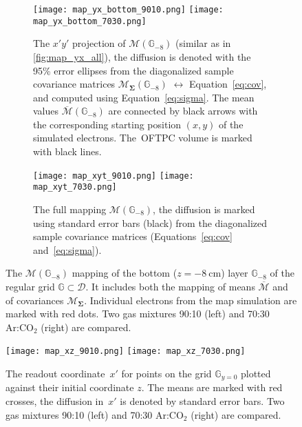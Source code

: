 		\begin{figure}
			\centering
			\begin{subfigure}[t]{\textwidth}
				\centering
				\texttt{[image: map\_yx\_bottom\_9010.png]}
				\hfill
				\texttt{[image: map\_yx\_bottom\_7030.png]}
				\caption{The $x'y'$ projection of $\mathcal{M}(\mathbb{G}_{-8})$ (similar as in \cref{fig:map_yx_all}), the diffusion is denoted with the 95\% error ellipses from  the diagonalized sample covariance matrices $\mathcal{M}_\mathbf{\Sigma}(\mathbb{G}_{-8})$ $\leftrightarrow$ Equation~\ref{eq:cov}, and computed using Equation~\ref{eq:sigma}. The mean values $\overline{\mathcal{M}}(\mathbb{G}_{-8})$ are connected by black arrows with the corresponding starting position $(x,y)$ of the simulated electrons. The~\ac{OFTPC} volume is marked with black lines.}
				\label{fig:map_yx_bot}
			\end{subfigure}
			
			\begin{subfigure}[t]{\textwidth}
				\centering
				\texttt{[image: map\_xyt\_9010.png]}
				\hfill
				\texttt{[image: map\_xyt\_7030.png]}
				\caption{The full mapping $\mathcal{M}(\mathbb{G}_{-8})$, the diffusion is marked using standard error bars (black) from the diagonalized sample covariance matrices (Equations~\ref{eq:cov} and~\ref{eq:sigma}).}
				\label{fig:map_xyt}
			\end{subfigure}
			\caption{The $\mathcal{M}(\mathbb{G}_{-8})$ mapping of the bottom ($z = \SI{-8}{\centi\meter}$) layer $\mathbb{G}_{-8}$ of the regular grid $\mathbb{G}\subset\mathcal{D}$. It includes both the mapping of means $\overline{\mathcal{M}}$ and of covariances $\mathcal{M}_\mathbf{\Sigma}$. Individual electrons from the map simulation are marked with red dots. Two gas mixtures 90:10 (left) and 70:30 Ar:CO$_2$ (right) are compared.}
			\label{fig:map_bot}
		\end{figure}
		
		\begin{figure}
			\centering
			\texttt{[image: map\_xz\_9010.png]}
			\hfill
			\texttt{[image: map\_xz\_7030.png]}
			\caption{The readout coordinate~$x'$ for points on the grid $\mathbb{G}_{y=0}$ plotted against their initial coordinate $z$. The means are marked with red crosses, the diffusion in~$x'$ is denoted by standard error bars. Two gas mixtures 90:10 (left) and 70:30 Ar:CO$_2$ (right) are compared.}
			\label{fig:map_xz}
		\end{figure}
		
